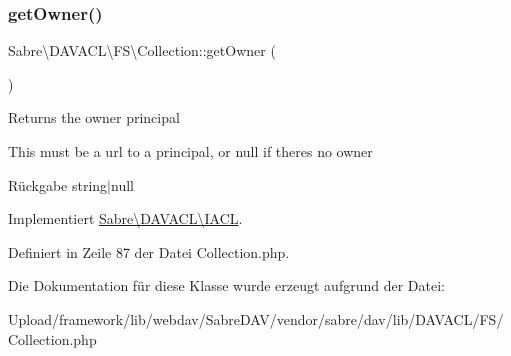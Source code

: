 \subsubsection{\texorpdfstring{get\+Owner()}{getOwner()}}
{\footnotesize\ttfamily Sabre\textbackslash{}\+D\+A\+V\+A\+C\+L\textbackslash{}\+F\+S\textbackslash{}\+Collection\+::get\+Owner (\begin{DoxyParamCaption}{ }\end{DoxyParamCaption})}

Returns the owner principal

This must be a url to a principal, or null if there\textquotesingle{}s no owner

\begin{DoxyReturn}{Rückgabe}
string$\vert$null 
\end{DoxyReturn}


Implementiert \mbox{\hyperlink{interface_sabre_1_1_d_a_v_a_c_l_1_1_i_a_c_l_a05f531b4ae1a86eab4e6e95b0413390e}{Sabre\textbackslash{}\+D\+A\+V\+A\+C\+L\textbackslash{}\+I\+A\+CL}}.



Definiert in Zeile 87 der Datei Collection.\+php.



Die Dokumentation für diese Klasse wurde erzeugt aufgrund der Datei\+:\begin{DoxyCompactItemize}
\item 
Upload/framework/lib/webdav/\+Sabre\+D\+A\+V/vendor/sabre/dav/lib/\+D\+A\+V\+A\+C\+L/\+F\+S/Collection.\+php\end{DoxyCompactItemize}
